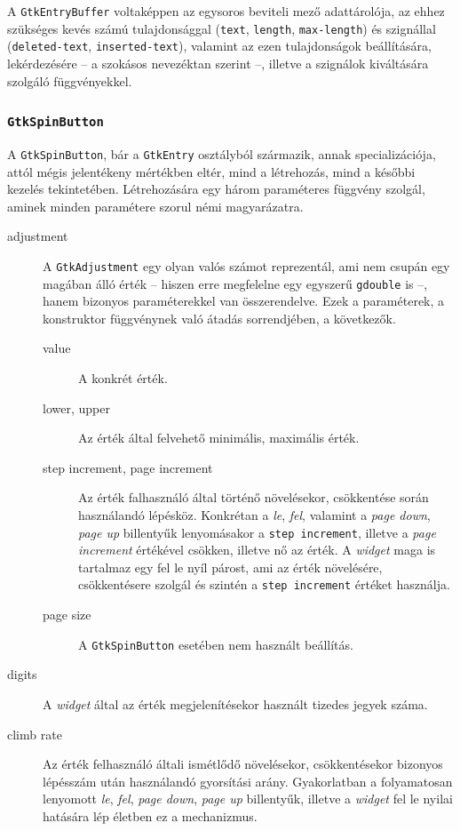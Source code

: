 A \texttt{GtkEntryBuffer} voltaképpen az egysoros beviteli mező adattárolója, az ehhez szükséges kevés számú tulajdonsággal (\texttt{text}, \texttt{length}, \texttt{max-length}) és szignállal (\texttt{deleted-text}, \texttt{inserted-text}), valamint az ezen tulajdonságok beállítására, lekérdezésére -- a szokásos nevezéktan szerint --, illetve a szignálok kiváltására szolgáló függvényekkel.

\subsubsection{\texttt{GtkSpinButton}}

A \texttt{GtkSpinButton}, bár a \texttt{GtkEntry} osztályból származik, annak specializációja, attól mégis jelentékeny mértékben eltér, mind a létrehozás, mind a későbbi kezelés tekintetében. Létrehozására egy három paraméteres függvény szolgál, aminek minden paramétere szorul némi magyarázatra.

\begin{description}

 \item[adjustment] A \texttt{GtkAdjustment} egy olyan valós számot reprezentál, ami nem csupán egy magában álló érték -- hiszen erre megfelelne egy egyszerű \texttt{gdouble} is --, hanem bizonyos paraméterekkel van összerendelve. Ezek a paraméterek, a konstruktor függvénynek való átadás sorrendjében, a következők.

 \begin{description}
  \item[value] A konkrét érték.
  \item[lower, upper] Az érték által felvehető minimális, maximális érték.
  \item[step increment, page increment] Az érték falhasználó által történő növelésekor, csökkentése során használandó lépésköz. Konkrétan a \textit{le}, \textit{fel}, valamint a \textit{page down}, \textit{page up} billentyűk lenyomásakor a \texttt{step increment}, illetve a \textit{page increment} értékével csökken, illetve nő az érték. A \textit{widget} maga is tartalmaz egy fel le nyíl párost, ami az érték növelésére, csökkentésere szolgál és szintén a \texttt{step increment} értéket használja.
  \item[page size] A \texttt{GtkSpinButton} esetében nem használt beállítás.
 \end{description}

 \item[digits] A \textit{widget} által az érték megjelenítésekor használt tizedes jegyek száma.
 \item[climb rate] Az érték felhasználó általi ismétlődő növelésekor, csökkentésekor bizonyos lépésszám után használandó gyorsítási arány. Gyakorlatban a folyamatosan lenyomott \textit{le}, \textit{fel}, \textit{page down}, \textit{page up} billentyűk, illetve a \textit{widget} fel le nyilai hatására lép életben ez a mechanizmus.
\end{description}

